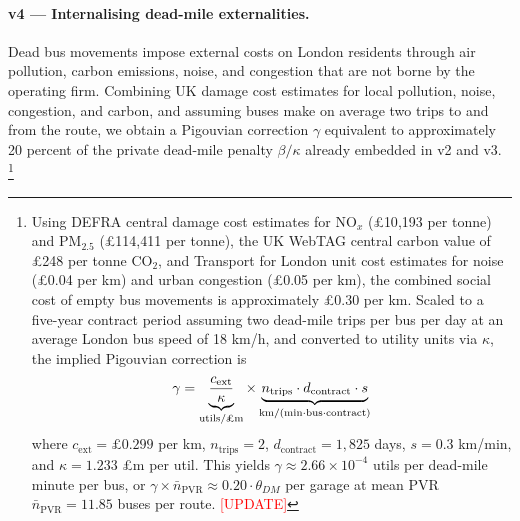 \documentclass[12pt]{article}
\begin{document}
\paragraph{v4 --- Internalising dead-mile externalities.}
Dead bus movements impose external costs on London residents through air
pollution, carbon emissions, noise, and congestion that are not borne by the
operating firm. Combining UK damage cost estimates for local pollution, noise,
congestion, and carbon, and assuming buses make on average two trips to and
from the route, we obtain a Pigouvian correction $\gamma$ equivalent to
approximately 20 percent of the private dead-mile penalty $\beta/\kappa$
already embedded in v2 and v3.%
\footnote{Using DEFRA central damage cost estimates for NO$_x$
({\pounds}10{,}193 per tonne) and PM$_{2.5}$ ({\pounds}114{,}411 per tonne),
the UK WebTAG central carbon value of {\pounds}248 per tonne CO$_2$, and
Transport for London unit cost estimates for noise ({\pounds}0.04 per km) and
urban congestion ({\pounds}0.05 per km), the combined social cost of empty bus
movements is approximately {\pounds}0.30 per km. Scaled to a five-year
contract period assuming two dead-mile trips per bus per day at an average
London bus speed of 18 km/h, and converted to utility units via $\kappa$, the
implied Pigouvian correction is
%
\begin{equation*}
  \gamma =
  \underbrace{\frac{c_{\mathrm{ext}}}{\kappa}}_{\text{utils/{\pounds}m}}
  \times
  \underbrace{n_{\mathrm{trips}} \cdot d_{\mathrm{contract}} \cdot s}_{%
    \text{km/(min$\cdot$bus$\cdot$contract)}}
\end{equation*}
%
where $c_{\mathrm{ext}} = {\pounds}0.299$ per km, $n_{\mathrm{trips}} = 2$,
$d_{\mathrm{contract}} = 1{,}825$ days, $s = 0.3$ km/min, and
$\kappa = 1.233$ {\pounds}m per util. This yields
$\gamma \approx 2.66 \times 10^{-4}$ utils per dead-mile minute per bus, or
$\gamma \times \bar{n}_{\mathrm{PVR}} \approx 0.20\cdot\theta_{DM}$ per
garage at mean PVR $\bar{n}_{\mathrm{PVR}} = 11.85$ buses per route.
\textcolor{red}{[UPDATE]}}
 
\end{document}
